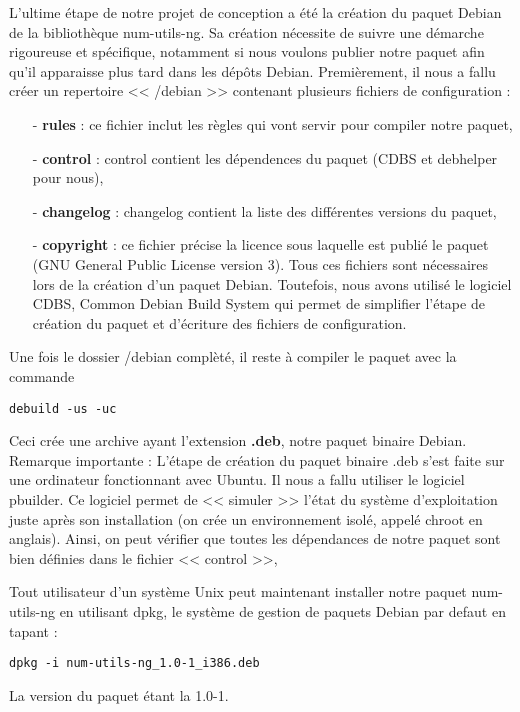 L'ultime \'etape de notre projet de conception a \'et\'e la cr\'eation du paquet Debian de la biblioth\`eque num-utils-ng.
Sa cr\'eation n\'ecessite de suivre une d\'emarche rigoureuse et sp\'ecifique, notamment si nous voulons publier notre paquet afin
qu'il apparaisse plus tard dans les d\'ep\^ots Debian.
\newline
Premi\`erement, il nous a fallu cr\'eer un repertoire << /debian >> contenant plusieurs fichiers de configuration :
\begin{itemize}
 \item [-] \textbf{rules} : ce fichier inclut les r\`egles qui vont servir pour compiler notre paquet,
 \item [-] \textbf{control} : control contient les d\'ependences du paquet (CDBS et debhelper pour nous),
 \item [-] \textbf{changelog} : changelog contient la liste des diff\'erentes versions du paquet, 
 \item [-] \textbf{copyright} : ce fichier pr\'ecise la licence sous laquelle est publi\'e le paquet (GNU General Public License version 3).
Tous ces fichiers sont n\'ecessaires lors  de la cr\'eation d'un paquet Debian. Toutefois, nous avons utilis\'e le logiciel 
CDBS, Common Debian Build System\citep{cdbs} qui permet de simplifier l'\'etape de cr\'eation du paquet et d'\'ecriture des fichiers de configuration.
\newline
\end{itemize}
Une fois le dossier /debian compl\`et\'e, il reste \`a compiler le paquet avec la commande
\begin{verbatim}debuild -us -uc\end{verbatim}
Ceci cr\'ee une archive ayant l'extension \textbf{.deb}, notre paquet binaire Debian.
\newline
Remarque importante : L'\'etape de cr\'eation du paquet binaire .deb s'est faite sur une ordinateur fonctionnant avec Ubuntu. Il nous a fallu utiliser le logiciel pbuilder. Ce logiciel
permet de << simuler >> l'\'etat du syst\`eme d'exploitation juste apr\`es son installation (on cr\'ee un environnement isol\'e, appel\'e chroot en anglais).
Ainsi, on peut v\'erifier que toutes les d\'ependances de notre paquet sont bien d\'efinies dans le fichier << control >>, 
\newline

Tout utilisateur d'un syst\`eme Unix peut maintenant installer notre paquet num-utils-ng en utilisant dpkg, le syst\`eme de gestion de paquets Debian 
par defaut en tapant :
\begin{verbatim}dpkg -i num-utils-ng_1.0-1_i386.deb\end{verbatim}
La version du paquet \'etant la 1.0-1.





